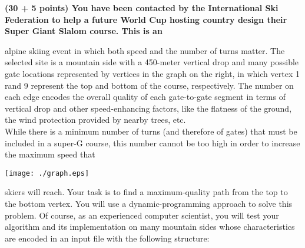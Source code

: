 \documentclass[12pt]{article}
\begin{document}
\begin{enumerate}
     {\bf \color{red} (30 + 5 points) You have been contacted by the
    International Ski Federation to help a future World Cup hosting
    country design their Super Giant Slalom course. This is an

    \begin{minipage}{0.55\linewidth}
     alpine skiing event in which both speed and the number of turns
     matter. The selected site is a mountain side with a 450-meter
     vertical drop and many possible gate locations represented by
     vertices in the graph on the right, in which vertex 1 rand 9 represent the
     top and bottom of the course, respectively. The number on each
     edge encodes the overall quality of each gate-to-gate segment in
     terms of vertical drop and other speed-enhancing factors, like
     the flatness of the ground, the wind protection provided by nearby
     trees, etc.\\

     While there is a minimum number of turns (and therefore of gates) that must
     be included in a super-G course, this number cannot be too high in
     order to increase the maximum speed that
     \end{minipage}\hfill
     \begin{minipage}{0.4\linewidth}
     \centerline{\texttt{[image: ./graph.eps]}} \end{minipage}

    skiers will reach. Your task is to find a maximum-quality path from the top to the
    bottom vertex. You will use a dynamic-programming approach to
    solve this problem. Of course, as an experienced computer
    scientist, you will test your algorithm and its implementation on
    many mountain sides whose characteristics are encoded in an input
    file with the following structure:

}
\end{enumerate}
\end{document}
